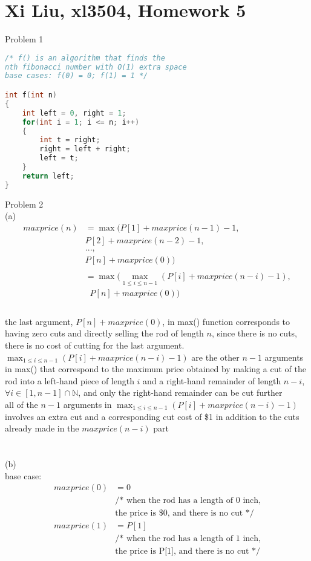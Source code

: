 \documentclass[12pt,border=4pt,multi]{article}%
\begin{document}
\section*{Xi Liu, xl3504, Homework 5}
Problem 1
\begin{lstlisting}[language = c]
/* f() is an algorithm that finds the
nth fibonacci number with O(1) extra space
base cases: f(0) = 0; f(1) = 1 */

int f(int n)
{
    int left = 0, right = 1;
    for(int i = 1; i <= n; i++)
    {
        int t = right;
        right = left + right;
        left = t;
    }
    return left;
}
\end{lstlisting}
\newpage
\noindent
Problem 2\\
(a)
\begin{align*}
maxprice(n) &= \max(P[1] + maxprice(n - 1) - 1,\\
&P[2] + maxprice(n - 2) - 1,\\
&...,\\
&P[n] + maxprice(0))\\
\\
&= \max\biggr(\max_{1 \leq i \leq n - 1}(P[i] + maxprice(n - i) - 1),\\
&\;\; P[n] + maxprice(0)\biggr)\\
\end{align*}
\\
the last argument, $P[n] + maxprice(0)$, in max() function corresponds to having zero cuts and directly selling the rod of length $n$, since there is no cuts, there is no cost of cutting for the last argument. $\max_{1 \leq i \leq n - 1}(P[i] + maxprice(n - i) - 1)$ are the other $n - 1$ arguments in max() that correspond to the maximum price obtained by making a cut of the rod into a left-hand piece of length $i$ and a right-hand remainder of length $n - i$, $\forall i \in [1, n - 1] \cap \mathbb{N}$, and only the right-hand remainder can be cut further\\
all of the $n - 1$ arguments in $\max_{1 \leq i \leq n - 1}(P[i] + maxprice(n - i) - 1)$ involves an extra cut and a corresponding cut cost of \$1 in addition to the cuts already made in the $maxprice(n - i)$ part\\
\\
\\
\newpage
\noindent
(b)\\
base case:
\begin{align*}
maxprice(0) &= 0\\
&\text{/* when the rod has a length of 0 inch,}\\
&\text{the price is \$0, and there is no cut */}\\
maxprice(1) &= P[1]\\
&\text{/* when the rod has a length of 1 inch,}\\
&\text{the price is P[1], and there is no cut */}\\
\end{align*}
\end{document}

